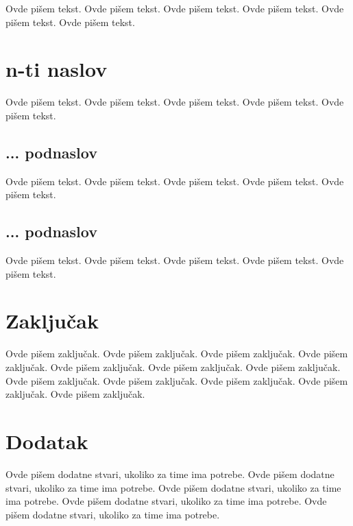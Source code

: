 \documentclass[a4paper]{article}
\begin{document}
Ovde pišem tekst. 
Ovde pišem tekst. 
Ovde pišem tekst. 
Ovde pišem tekst. 
Ovde pišem tekst. 
Ovde pišem tekst. 

\section{n-ti naslov}
\label{sec:naslovN}

Ovde pišem tekst. 
Ovde pišem tekst. 
Ovde pišem tekst. 
Ovde pišem tekst. 
Ovde pišem tekst. 

\subsection{... podnaslov}
\label{subsec:podnaslovK}

Ovde pišem tekst. 
Ovde pišem tekst. 
Ovde pišem tekst. 
Ovde pišem tekst. 
Ovde pišem tekst. 

\subsection{... podnaslov}
\label{subsec:podnaslovM}

Ovde pišem tekst. 
Ovde pišem tekst. 
Ovde pišem tekst. 
Ovde pišem tekst. 
Ovde pišem tekst. 


\section{Zaključak}
\label{sec:zakljucak}

Ovde pišem zaključak. 
Ovde pišem zaključak. 
Ovde pišem zaključak. 
Ovde pišem zaključak. 
Ovde pišem zaključak. 
Ovde pišem zaključak. 
Ovde pišem zaključak. 
Ovde pišem zaključak. 
Ovde pišem zaključak. 
Ovde pišem zaključak. 
Ovde pišem zaključak. 
Ovde pišem zaključak. 


\appendix
 


\appendix
\section{Dodatak}
Ovde pišem dodatne stvari, ukoliko za time ima potrebe.
Ovde pišem dodatne stvari, ukoliko za time ima potrebe.
Ovde pišem dodatne stvari, ukoliko za time ima potrebe.
Ovde pišem dodatne stvari, ukoliko za time ima potrebe.
Ovde pišem dodatne stvari, ukoliko za time ima potrebe.
\end{document}
